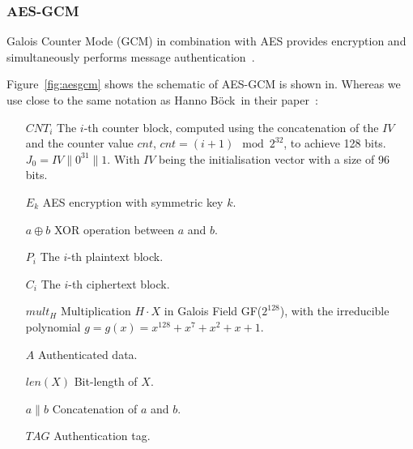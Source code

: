 \subsubsection{AES-GCM}

Galois Counter Mode (GCM) in combination with AES provides encryption and
simultaneously performs message authentication~\cite{gcm, gcmnist}.

Figure~\ref{fig:aesgcm} shows the schematic of AES-GCM is shown in. Whereas we
use close to the same notation as Hanno Böck~\etal in their
paper~\cite{gcmnonceattack}:

\begin{itemize}
  \item[$CNT_i$] The $i$-th counter block, computed using the concatenation of
the $IV$ and the counter value $cnt$, $cnt = (i+1) \mod{2^{32}}$, to achieve 128
bits. $J_0 = IV \parallel 0 ^{31} \parallel 1$. With $IV$ being the
initialisation vector with a size of 96 bits.
  \item[$E_k$] AES encryption with symmetric key $k$.
  \item[$a \oplus b$] XOR operation between $a$ and $b$.
  \item[$P_i$] The $i$-th plaintext block.
  \item[$C_i$] The $i$-th ciphertext block.
  \item[$mult_H$] Multiplication $H \cdot X$ in Galois Field GF($2^{128}$),
with the irreducible polynomial $g = g(x) = x^{128} + x^{7} + x^{2} + x + 1$.
  \item[$A$] Authenticated data.
  \item[$len(X)$] Bit-length of $X$.
  \item[$a \parallel b$] Concatenation of $a$ and $b$.
  \item[$TAG$] Authentication tag.
\end{itemize}

